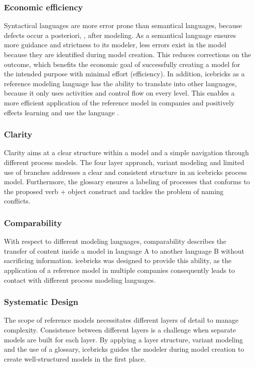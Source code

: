 	  \subsubsection{Economic efficiency}
	 Syntactical languages are more error prone than semantical languages, because defects occur a posteriori, \ie, after modeling. As a semantical language ensures more guidance and strictness to its modeler, less errors exist in the model because they are identified during model creation. This reduces corrections on the outcome, which benefits the economic goal of successfully creating a model for the intended purpose with minimal effort (efficiency). In addition, icebricks as a reference modeling language has the ability to translate into other languages, because it only uses activities and control flow on every level. This enables a more efficient application of the reference model in companies and positively effects learning and use the language \citep{Muehlen}. 
	 
	 \subsubsection{Clarity}
	 Clarity aims at a clear structure within a model and a simple navigation through different process models. The four layer approach, variant modeling and limited use of branches addresses a clear and consistent structure in an icebricks process model. Furthermore, the glossary ensures a labeling of processes that conforms to the proposed verb + object construct \citep{7pmg} and tackles the problem of naming conflicts.
	 
	 \subsubsection{Comparability} 
	 With respect to different modeling languages, comparability describes the transfer of content inside a model in language A to another language B without sacrificing information. icebricks was designed to provide this ability, as the application of a reference model in multiple companies consequently leads to contact with different process modeling languages. 
	 
	 \subsubsection{Systematic Design}
	 The scope of reference models necessitates different layers of detail to manage complexity. Consistence between different layers is a challenge when separate models are built for each layer. By applying a layer structure, variant modeling and the use of a glossary, icebricks guides the modeler during model creation to create well-structured models in the first place. 

	
